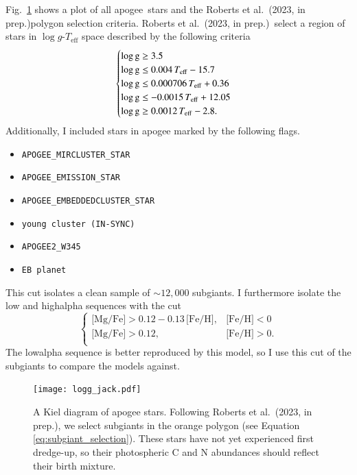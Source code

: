 \documentclass[12pt,oneside,letterpaper]{report}
\newcommand{\apogee}{\gls{apogee}}
\newcommand{\citetjack}{Roberts et al.~(2023, in prep.)}
\newcommand{\about}[1]{${\sim} #1$}
\begin{document}
Fig.~\ref{fig:subgiant_selection} shows a plot of all \apogee\ stars and the \citetjack polygon selection criteria. 
 \citetjack~select a region of stars in $\log g$-$T_\text{eff}$ space described by the following criteria
 \begin{equation}
    \begin{cases} \label{eq:subgiant_selection}
        \log \text{g} \geq 3.5 \\
        \log \text{g} \leq 0.004\,T_{\rm eff} - 15.7 \\
        \log \text{g} \leq 0.000706\,T_{\rm eff} + 0.36 \\
        \log \text{g} \leq -0.0015\,T_{\rm eff} + 12.05 \\
        \log \text{g} \geq 0.0012\,T_{\rm eff} - 2.8. \\
    \end{cases}
\end{equation}
Additionally, I included stars in \apogee{} marked by the following flags.
\begin{itemize}
\item \verb|APOGEE_MIRCLUSTER_STAR|
\item \verb|APOGEE_EMISSION_STAR|
\item \verb|APOGEE_EMBEDDEDCLUSTER_STAR|
\item \verb|young cluster (IN-SYNC)|
\item \verb|APOGEE2_W345|
\item \verb|EB planet|
\end{itemize}
This cut isolates a clean sample of \about{12,000} \gls{subgiant}s.
I furthermore isolate the low and \gls{highalpha} sequences with the cut
\begin{equation}\label{eq:high_alpha}
\begin{cases}
\text{[Mg/Fe]} >0.12-0.13\,\text{[Fe/H]}, & \text{[Fe/H]}<0\\
\text{[Mg/Fe]} >0.12, & \text{[Fe/H]}>0. \\
\end{cases}
\end{equation}
The \gls{lowalpha} sequence is better reproduced by this model, so I use this cut of the subgiants to compare the models against. 




\begin{figure}
    \centering
    \texttt{[image: logg\_jack.pdf]}
    \caption[Subgiant selection]{
        A Kiel diagram of \apogee{} stars. Following \citetjack, we select \gls{subgiant}s in the orange polygon (see Equation \ref{eq:subgiant_selection}). These stars have not yet experienced first dredge-up, so their photospheric C and N abundances should reflect their birth mixture.
    }
    \label{fig:subgiant_selection}
\end{figure}
\end{document}
